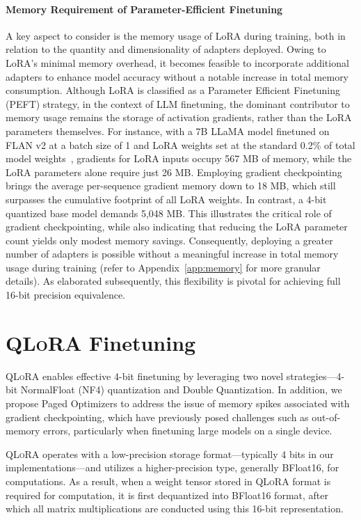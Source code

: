 \paragraph{Memory Requirement of Parameter-Efficient Finetuning} A key aspect to consider is the memory usage of LoRA during training, both in relation to the quantity and dimensionality of adapters deployed. Owing to LoRA's minimal memory overhead, it becomes feasible to incorporate additional adapters to enhance model accuracy without a notable increase in total memory consumption. Although LoRA is classified as a Parameter Efficient Finetuning (PEFT) strategy, in the context of LLM finetuning, the dominant contributor to memory usage remains the storage of activation gradients, rather than the LoRA parameters themselves. For instance, with a 7B LLaMA model finetuned on FLAN v2 at a batch size of 1 and LoRA weights set at the standard 0.2\% of total model weights~\citep{hu2021lora,liu2022few}, gradients for LoRA inputs occupy 567 MB of memory, while the LoRA parameters alone require just 26 MB. Employing gradient checkpointing~\citep{chen2016training} brings the average per-sequence gradient memory down to 18 MB, which still surpasses the cumulative footprint of all LoRA weights. In contrast, a 4-bit quantized base model demands 5,048 MB. This illustrates the critical role of gradient checkpointing, while also indicating that reducing the LoRA parameter count yields only modest memory savings. Consequently, deploying a greater number of adapters is possible without a meaningful increase in total memory usage during training (refer to Appendix~\ref{app:memory} for more granular details). As elaborated subsequently, this flexibility is pivotal for achieving full 16-bit precision equivalence.

\section{\textsc{QLoRA} Finetuning}

\textsc{QLoRA} enables effective 4-bit finetuning by leveraging two novel strategies—4-bit NormalFloat (NF4) quantization and Double Quantization. In addition, we propose Paged Optimizers to address the issue of memory spikes associated with gradient checkpointing, which have previously posed challenges such as out-of-memory errors, particularly when finetuning large models on a single device.

\textsc{QLoRA} operates with a low-precision storage format—typically 4 bits in our implementations—and utilizes a higher-precision type, generally BFloat16, for computations. As a result, when a weight tensor stored in \textsc{QLoRA} format is required for computation, it is first dequantized into BFloat16 format, after which all matrix multiplications are conducted using this 16-bit representation.

